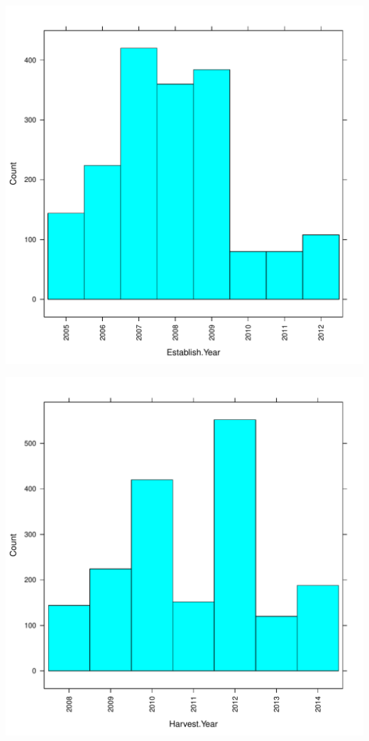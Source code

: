 \documentclass{article}\usepackage[]{graphicx}\usepackage[]{color}
\makeatletter
\def\maxwidth{ %
  \ifdim\Gin@nat@width>\linewidth
    \linewidth
  \else
    \Gin@nat@width
  \fi
}
\newenvironment{knitrout}{}{} %
\makeatother
\begin{document}
\begin{knitrout}
\color{fgcolor}

{\centering \includegraphics[width=\maxwidth]{figure/HistogramsDescriptorVariables-1} 

}




{\centering \includegraphics[width=\maxwidth]{figure/HistogramsDescriptorVariables-2} 

}
\end{knitrout}
\end{document}
